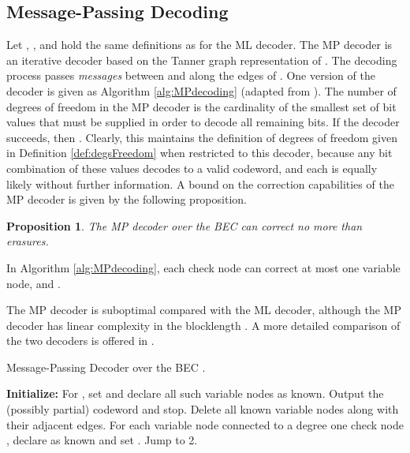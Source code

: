 \documentclass[10pt,twocolumn,twoside]{IEEEtran} \newlength{\pic}
\newtheorem{proposition}{Proposition}
\theoremstyle{definition}
\theoremstyle{remark}
\theoremstyle{plain}
\begin{document}
\subsection{Message-Passing Decoding}\label{subsec:MP}

Let , , and  hold the same definitions as for the ML decoder. The MP decoder is an iterative decoder based on the Tanner graph representation of . The decoding process passes \emph{messages} between  and  along the edges of . One version of the decoder is given as Algorithm \ref{alg:MPdecoding} (adapted from \cite{Urbanke01}). The number of degrees of freedom in the MP decoder  is the cardinality of the smallest set of bit values that must be supplied in order to decode all remaining bits. If the decoder succeeds, then . Clearly, this maintains the definition of degrees of freedom given in Definition \ref{def:degsFreedom} when restricted to this decoder, because any bit combination of these  values decodes to a valid codeword, and each is equally likely without further information. A bound on the correction capabilities of the MP decoder is given by the following proposition.
\begin{proposition}\label{prop:maxDecodMP}
  The MP decoder over the BEC can correct no more than  erasures.
\end{proposition}
\begin{IEEEproof}
 In Algorithm \ref{alg:MPdecoding}, each check node can correct at most one variable node, and .
\end{IEEEproof}
The MP decoder is suboptimal compared with the ML decoder, although the MP decoder has linear complexity in the blocklength \cite{MoonArches}. A more detailed comparison of the two decoders is offered in \cite{Lee07}.

\begin{algorithm}[h]
\caption{Message-Passing Decoder over the BEC \cite{Urbanke01}.}
\begin{algorithmic}[1]
\STATE \textbf{Initialize:} For , set  and declare all such variable nodes as known.
    \STATE Output the (possibly partial) codeword and stop.
  \ELSE
    \STATE Delete all known variable nodes along with their adjacent edges.
  \ENDIF
  \STATE For each variable node  connected to a degree one check node , declare  as known and set . Jump to 2.
\end{algorithmic}
\label{alg:MPdecoding}
\end{algorithm}
\end{document}
